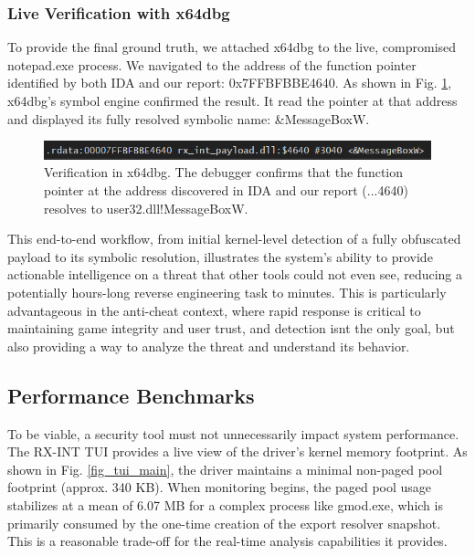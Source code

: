 \documentclass[journal]{IEEEtran}
\begin{document}
\subsubsection{Live Verification with x64dbg}
To provide the final ground truth, we attached x64dbg to the live, compromised notepad.exe process. We navigated to the address of the function pointer identified by both IDA and our report: 0x7FFBFBBE4640. As shown in Fig. \ref{fig_x64dbg}, x64dbg's symbol engine confirmed the result. It read the pointer at that address and displayed its fully resolved symbolic name: \&MessageBoxW.
\begin{figure}[!t]
\centering
\includegraphics[width=\columnwidth]{figures/x64dbg_resolve.png}
\caption{Verification in x64dbg. The debugger confirms that the function pointer at the address discovered in IDA and our report (...4640) resolves to user32.dll!MessageBoxW.}
\label{fig_x64dbg}
\end{figure}
This end-to-end workflow, from initial kernel-level detection of a fully obfuscated payload to its symbolic resolution, illustrates the system's ability to provide actionable intelligence on a threat that other tools could not even see, reducing a potentially hours-long reverse engineering task to minutes. This is particularly advantageous in the anti-cheat context, where rapid response is critical to maintaining game integrity and user trust, and detection isnt the only goal, but also providing a way to analyze the threat and understand its behavior.

\subsection{Performance Benchmarks}
To be viable, a security tool must not unnecessarily impact system performance. The RX-INT TUI provides a live view of the driver's kernel memory footprint. As shown in Fig. \ref{fig_tui_main}, the driver maintains a minimal non-paged pool footprint (approx. 340 KB). When monitoring begins, the paged pool usage stabilizes at a mean of 6.07 MB for a complex process like gmod.exe, which is primarily consumed by the one-time creation of the export resolver snapshot. This is a reasonable trade-off for the real-time analysis capabilities it provides.
\end{document}
